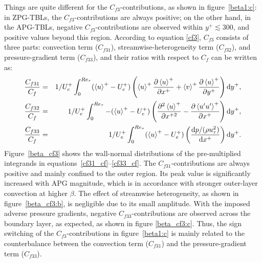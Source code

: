 Things are quite different for the $C_{f3}$-contributions, as shown in figure~\ref{beta1:c}: in ZPG-TBLs, the $C_{f3}$-contributions are always positive;
on the other hand, in the APG-TBLs, negative $C_{f3}$-contributions are observed within $y^+\lesssim300$, and positive values beyond this region. According to equation \eqref{cf3}, $C_{f3}$ consists of three parts: convection term ($C_{f31}$), streamwise-heterogeneity term ($C_{f32}$), and pressure-gradient term ($C_{f33}$), and their ratios with respect to $C_f$ can be written as:
\begin{eqnarray}
\frac{C_{f31}}{C_f}&=&1/U_e^+\int_{0}^{Re_\tau}(\left<u\right>^+-U_e^+)\left(\left<u\right>^+\frac{\partial\left<u\right>^+}{\partial x^+}+\left<v\right>^+\frac{\partial\left<u\right>^+}{\partial y^+}\right) {\rm d}y^+,\label{cf31_cf}\\
\frac{C_{f32}}{C_f}&=&1/U_e^+\int_{0}^{Re_\tau}-(\left<u\right>^+-U_e^+)\left( \frac{\partial^2\left<u\right>^+}{\partial x^{+2}}-\frac{\partial\left<u'u'\right>^+}{\partial x^+}\right) {\rm d}y^+,\label{cf32_cf}\\
\frac{C_{f33}}{C_f}&=&1/{U_e^+}\int_{0}^{Re_\tau}(\left<u\right>^+-U_e^+)\left(\frac{{\rm d}  p/(\rho u_\tau^2)}{{\rm d}  x^+}\right) {\rm d}y^+.\label{cf33_cf}
\end{eqnarray}
Figure~\ref{beta_cf3} shows the wall-normal distributions of the pre-multiplied integrands in equations~\eqref{cf31_cf}--\eqref{cf33_cf}.
The $C_{f31}$-contributions are always positive and mainly confined to the outer region. Its peak value is significantly increased with APG magnitude, which is in accordance with stronger outer-layer convection at higher $\beta$. The effect of streamwise heterogeneity, as shown in figure~\ref{beta_cf3:b}, is negligible due to its small amplitude. 
With the imposed adverse pressure gradients, negative $C_{f33}$-contributions are observed across the boundary layer, as expected, as shown in figure \ref{beta_cf3:c}. Thus, the sign switching of the $C_{f3}$-contributions in figure~\ref{beta1:c} is mainly related to the counterbalance between the convection term ($C_{f31}$) and the pressure-gradient term ($C_{f33}$).


